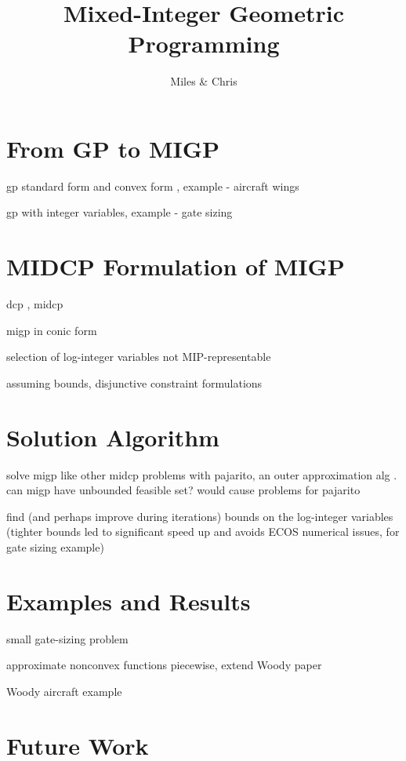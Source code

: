 \documentclass[]{article}
\title{Mixed-Integer Geometric Programming}
\author{Miles \& Chris}
\date{}
\begin{document}
\maketitle


\section{From GP to MIGP}

gp standard form and convex form \cite{boyd07}, example - aircraft wings \cite{hoburg14a}

gp with integer variables, example - gate sizing \cite{boyd07}



\section{MIDCP Formulation of MIGP}

dcp \cite{boyd06}, midcp \cite{lubin15}

migp in conic form

selection of log-integer variables not MIP-representable

assuming bounds, disjunctive constraint formulations



\section{Solution Algorithm}

solve migp like other midcp problems with pajarito, an outer approximation alg \cite{lubin15}. can migp have unbounded feasible set? would cause problems for pajarito

find (and perhaps improve during iterations) bounds on the log-integer variables (tighter bounds led to significant speed up and avoids ECOS numerical issues, for gate sizing example)



\section{Examples and Results}

small gate-sizing problem

approximate nonconvex functions piecewise, extend Woody paper \cite{hoburg14b}

Woody aircraft example



\section{Future Work}
\end{document}
